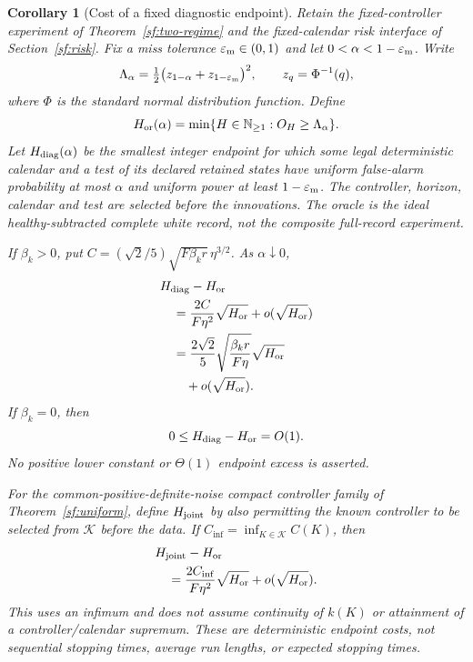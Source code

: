 \documentclass[journal]{IEEEtran}
\newtheorem{corollary}{Corollary}
\begin{document}
\begin{corollary}[Cost of a fixed diagnostic endpoint]
\label{sf:fixed-endpoint-cor}
Retain the fixed-controller experiment of Theorem~\ref{sf:two-regime}
and the fixed-calendar risk interface of Section~\ref{sf:risk}.
Fix a miss tolerance $\varepsilon_{\rm m}\in(0,1)$ and let
$0<\alpha<1-\varepsilon_{\rm m}$. Write
\begin{equation}\label{sf:endpoint-threshold}
\Lambda_\alpha=\tfrac12
 \bigl(z_{1-\alpha}+z_{1-\varepsilon_{\rm m}}\bigr)^2,
\qquad z_q=\Phi^{-1}(q),
\end{equation}
where $\Phi$ is the standard normal distribution function. Define
\begin{equation}\label{sf:endpoint-oracle}
H_{\rm or}(\alpha)=\min\{H\in\mathbb N_{\ge1}:O_H\ge\Lambda_\alpha\}.
\end{equation}
Let $H_{\rm diag}(\alpha)$ be the smallest integer endpoint for which
some legal deterministic calendar and a test of its declared retained states
have uniform false-alarm probability at most $\alpha$ and uniform power at
least $1-\varepsilon_{\rm m}$. The controller, horizon, calendar and test
are selected before the innovations. The oracle is the ideal
healthy-subtracted complete white record, not the composite full-record
experiment.

If $\beta_k>0$, put
$C=(\sqrt2/5)\sqrt{F\beta_k r}\,\eta^{3/2}$. As $\alpha\downarrow0$,
\begin{equation}\label{sf:endpoint-positive}
\begin{aligned}
&H_{\rm diag}-H_{\rm or}\\
&\quad=\frac{2C}{F\eta^2}\sqrt{H_{\rm or}}+o(\sqrt{H_{\rm or}})\\
&\quad=\frac{2\sqrt2}{5}\sqrt{\frac{\beta_k r}{F\eta}}
   \sqrt{H_{\rm or}}\\
&\qquad+o(\sqrt{H_{\rm or}}).
\end{aligned}
\end{equation}
If $\beta_k=0$, then
\begin{equation}\label{sf:endpoint-zero}
0\le H_{\rm diag}-H_{\rm or}=O(1).
\end{equation}
No positive lower constant or $\Theta(1)$ endpoint excess is asserted.

For the common-positive-definite-noise compact controller family of
Theorem~\ref{sf:uniform}, define $H_{\rm joint}$ by also permitting the
known controller to be selected from $\mathcal K$ before the data. If
$C_{\inf}=\inf_{K\in\mathcal K}C(K)$, then
\begin{equation}\label{sf:endpoint-joint}
\begin{aligned}
&H_{\rm joint}-H_{\rm or}\\
&\quad=\frac{2C_{\inf}}{F\eta^2}\sqrt{H_{\rm or}}
  +o(\sqrt{H_{\rm or}}).
\end{aligned}
\end{equation}
This uses an infimum and does not assume continuity of $k(K)$ or attainment
of a controller/calendar supremum. These are deterministic endpoint costs,
not sequential stopping times, average run lengths, or expected stopping times.
\end{corollary}
\end{document}
